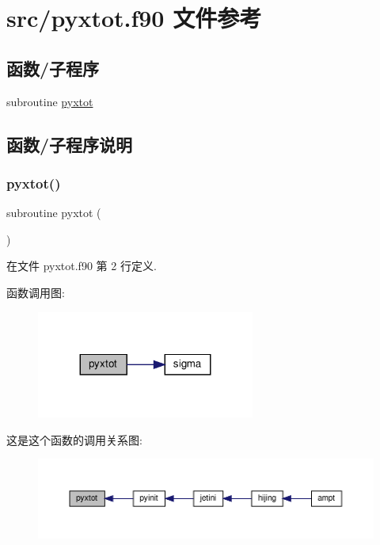 \hypertarget{pyxtot_8f90}{}\section{src/pyxtot.f90 文件参考}
\label{pyxtot_8f90}
\subsection*{函数/子程序}
\begin{DoxyCompactItemize}
\item 
subroutine \mbox{\hyperlink{pyxtot_8f90_aefa74679a96bc60a9275508c987b41ee}{pyxtot}}
\end{DoxyCompactItemize}


\subsection{函数/子程序说明}
\mbox{\label{pyxtot_8f90_aefa74679a96bc60a9275508c987b41ee}} 
\subsubsection{\texorpdfstring{pyxtot()}{pyxtot()}}
{\footnotesize\ttfamily subroutine pyxtot (\begin{DoxyParamCaption}{ }\end{DoxyParamCaption})}



在文件 pyxtot.\+f90 第 2 行定义.

函数调用图\+:
\nopagebreak
\begin{figure}[H]
\begin{center}
\leavevmode
\includegraphics[width=203pt]{pyxtot_8f90_aefa74679a96bc60a9275508c987b41ee_cgraph}
\end{center}
\end{figure}
这是这个函数的调用关系图\+:
\nopagebreak
\begin{figure}[H]
\begin{center}
\leavevmode
\includegraphics[width=350pt]{pyxtot_8f90_aefa74679a96bc60a9275508c987b41ee_icgraph}
\end{center}
\end{figure}

